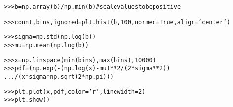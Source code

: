 \begin{boxedminipage}{\funcwidth}
\begin{alltt}
{\textgreater}{\textgreater}{\textgreater} b = np.array(b) / np.min(b) \# scale values to be positive

{\textgreater}{\textgreater}{\textgreater} count, bins, ignored = plt.hist(b, 100, normed=True, align='center')

{\textgreater}{\textgreater}{\textgreater} sigma = np.std(np.log(b))
{\textgreater}{\textgreater}{\textgreater} mu = np.mean(np.log(b))

{\textgreater}{\textgreater}{\textgreater} x = np.linspace(min(bins), max(bins), 10000)
{\textgreater}{\textgreater}{\textgreater} pdf = (np.exp(-(np.log(x) - mu)**2 / (2 * sigma**2))
...        / (x * sigma * np.sqrt(2 * np.pi)))

{\textgreater}{\textgreater}{\textgreater} plt.plot(x, pdf, color='r', linewidth=2)
{\textgreater}{\textgreater}{\textgreater} plt.show()
\end{alltt}

\setlength{\parskip}{1ex}
    \end{boxedminipage}

    \label{QSTK:qstklearn:mldiagnostics:logseries}

    \vspace{0.5ex}

